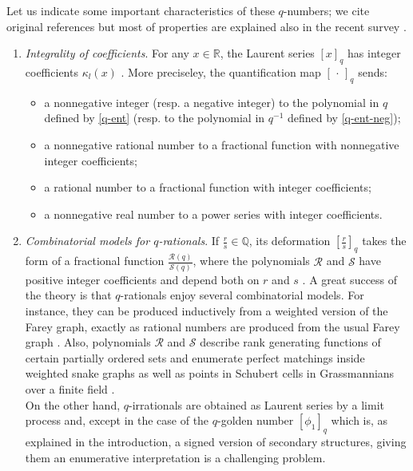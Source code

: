 \documentclass[11pt,reqno]{amsart}
\theoremstyle{plain}
\theoremstyle{definition}
\numberwithin{figure}{section}
\numberwithin{table}{section}
\numberwithin{equation}{section}
\newcommand{\R}{\mathbb{R}}
\newcommand{\Q}{\mathbb{Q}}
\newcommand\ka{\kappa}
\let\fr=\frac
\begin{document}
Let us indicate some important characteristics of these $q$-numbers; we cite  original references but most of  properties are explained also in  the recent survey \cite{MGO}. 
\begin{enumerate}[wide]
\item \emph{Integrality of coefficients}.  For any $x\in\R$, the Laurent series $[x]_q$ has integer coefficients $\ka_l(x)$ \cite{MGO22}. More preciseley, the quantification map $[\,\cdot\,]_q$ sends:
\begin{itemize}[leftmargin=3em]
\item a nonnegative integer (resp. a negative integer) to the polynomial in $q$ defined by \eqref{q-ent} (resp. to the polynomial in $q^{-1}$ defined by \eqref{q-ent-neg});
\item a nonnegative rational number to a fractional function with nonnegative integer coefficients;
\item a rational number to a fractional function with integer coefficients;
\item a nonnegative real number to a power series with integer coefficients.
\end{itemize}
\item \emph{Combinatorial models for $q$-rationals}. If $\fr r{s}\in\Q$,  its deformation $[\fr r{s}]_q$ takes the form of a fractional function $\fr{\mathcal R(q)}{\mathcal S(q)}$, where the polynomials $\mathcal R$ and $\mathcal S$ have positive integer coefficients and depend both on $r$ and $s$ \cite{MGO20}. A great success of the theory is  that  $q$-rationals enjoy several combinatorial models. For instance, they can be produced inductively from a weighted version of the Farey graph, exactly as  rational numbers are produced from the usual Farey graph \cite{MGO20}. Also, polynomials $\mathcal R$ and $\mathcal S$ describe rank generating functions of certain partially ordered sets \cite{MGO20} and enumerate perfect matchings inside weighted snake graphs \cite{Ovsienko} as well as points in Schubert cells in Grassmannians over a finite field \cite{Ovenhouse23}.
\\
On the other hand, $q$-irrationals are obtained as Laurent series by a limit process and, except in the case of the $q$-golden number $[\phi_1]_q$ which is, as explained in the introduction, a signed version of secondary structures, giving them an enumerative interpretation is a  challenging problem. 


\end{enumerate}
\end{document}
